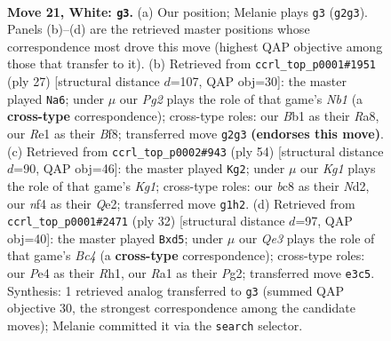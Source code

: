 \documentclass[11pt]{article}
\begin{document}
\clearpage

\begin{figure}[p]\centering
\begin{subfigure}{0.46\textwidth}\centering
\resizebox{\linewidth}{!}{%
\newchessgame
\chessboard[
  setfen={r1br4/ppp2pk1/3p4/4b2p/N1P1Pn1q/4Q2p/PP3PP1/RBB1R1K1 w - - 0 21},
  showmover=false,
  pgfstyle=straightmove, color=movearrow, markmove={g2-g3}
]}
\caption{}
\end{subfigure}\hfill
\begin{subfigure}{0.46\textwidth}\centering
\resizebox{\linewidth}{!}{%
\newchessgame
\chessboard[
  setfen={rn2kb1r/pb3pq1/2p1p2p/1p6/2p1PQ1P/2N3B1/PP3PP1/3RKB1R b Kkq - 3 14},
  showmover=false,
  pgfstyle=straightmove, color=movearrow, markmove={b8-a6}
]}
\caption{}
\end{subfigure}
\\[4pt]
\begin{subfigure}{0.46\textwidth}\centering
\resizebox{\linewidth}{!}{%
\newchessgame
\chessboard[
  setfen={2r3k1/1b1r1pb1/pq4pp/1p2p2n/1PP1P3/1R1B2PP/3NQP2/B3R1K1 w - - 3 28},
  showmover=false,
  pgfstyle=straightmove, color=movearrow, markmove={g1-g2}
]}
\caption{}
\end{subfigure}\hfill
\begin{subfigure}{0.46\textwidth}\centering
\resizebox{\linewidth}{!}{%
\newchessgame
\chessboard[
  setfen={r3kb1r/p1p2qpp/1p2b3/1P1n1p2/Q1B1p3/P1N1P3/1B3PPP/R3K2R w KQkq - 0 17},
  showmover=false,
  pgfstyle=straightmove, color=movearrow, markmove={c4-d5}
]}
\caption{}
\end{subfigure}
\caption{\textbf{Move 21, White: \texttt{g3}.} (a) Our position; Melanie plays \texttt{g3} (\texttt{g2g3}). Panels (b)--(d) are the retrieved master positions whose correspondence most drove this move (highest QAP objective among those that transfer to it). (b) Retrieved from \texttt{ccrl\_top\_p0001\#1951} (ply 27) [structural distance $d$=107, QAP obj=30]: the master played \texttt{Na6}; under $\mu$ our \emph{Pg2} plays the role of that game's \emph{Nb1} (a \textbf{cross-type} correspondence); cross-type roles: our \emph{B}b1 as their \emph{R}a8, our \emph{R}e1 as their \emph{B}f8; transferred move \texttt{g2g3} \textbf{(endorses this move)}. (c) Retrieved from \texttt{ccrl\_top\_p0002\#943} (ply 54) [structural distance $d$=90, QAP obj=46]: the master played \texttt{Kg2}; under $\mu$ our \emph{Kg1} plays the role of that game's \emph{Kg1}; cross-type roles: our \emph{b}c8 as their \emph{N}d2, our \emph{n}f4 as their \emph{Q}e2; transferred move \texttt{g1h2}. (d) Retrieved from \texttt{ccrl\_top\_p0001\#2471} (ply 32) [structural distance $d$=97, QAP obj=40]: the master played \texttt{Bxd5}; under $\mu$ our \emph{Qe3} plays the role of that game's \emph{Bc4} (a \textbf{cross-type} correspondence); cross-type roles: our \emph{P}e4 as their \emph{R}h1, our \emph{R}a1 as their \emph{P}g2; transferred move \texttt{e3c5}. Synthesis: 1 retrieved analog transferred to \texttt{g3} (summed QAP objective 30, the strongest correspondence among the candidate moves); Melanie committed it via the \texttt{search} selector.}
\label{fig:thought-m40}
\end{figure}
\end{document}
